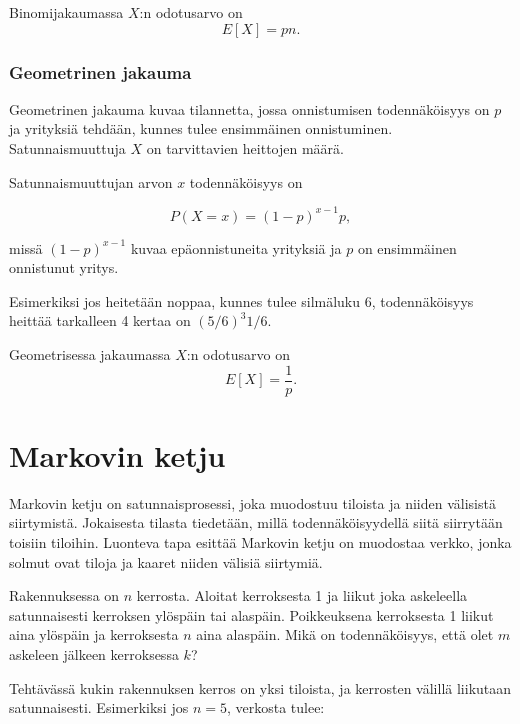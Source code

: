 Binomijakaumassa $X$:n odotusarvo on
\[E[X] = pn.\]

\subsubsection*{Geometrinen jakauma}

Geometrinen jakauma kuvaa tilannetta,
jossa onnistumisen todennäköisyys on $p$
ja yrityksiä tehdään, kunnes tulee ensimmäinen
onnistuminen. Satunnaismuuttuja $X$ on
tarvittavien heittojen määrä.

Satunnaismuuttujan arvon $x$ todennäköisyys on

\[P(X=x)=(1-p)^{x-1} p,\]

missä $(1-p)^{x-1}$ kuvaa epäonnistuneita yrityksiä ja
$p$ on ensimmäinen onnistunut yritys.

Esimerkiksi jos heitetään noppaa,
kunnes tulee silmäluku 6, todennäköisyys
heittää tarkalleen 4 kertaa on $(5/6)^3 1/6$.

Geometrisessa jakaumassa $X$:n odotusarvo on
\[E[X]=\frac{1}{p}.\]

\section{Markovin ketju}

Markovin ketju on satunnaisprosessi,
joka muodostuu tiloista ja niiden välisistä siirtymistä.
Jokaisesta tilasta tiedetään, millä todennäköisyydellä
siitä siirrytään toisiin tiloihin.
Luonteva tapa esittää Markovin ketju on
muodostaa verkko, jonka solmut ovat tiloja
ja kaaret niiden välisiä siirtymiä.

\begin{task}
Rakennuksessa on $n$ kerrosta.
Aloitat kerroksesta 1 ja liikut joka askeleella
satunnaisesti kerroksen ylöspäin tai alaspäin.
Poikkeuksena kerroksesta 1 liikut aina ylöspäin
ja kerroksesta $n$ aina alaspäin.
Mikä on todennäköisyys, että olet $m$
askeleen jälkeen kerroksessa $k$?
\end{task}

Tehtävässä kukin rakennuksen kerros
on yksi tiloista, ja kerrosten välillä liikutaan
satunnaisesti.
Esimerkiksi jos $n=5$, verkosta tulee:

